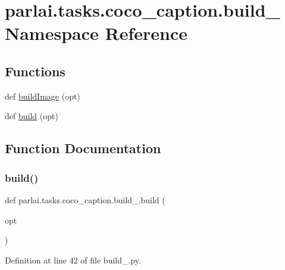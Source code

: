 \hypertarget{namespaceparlai_1_1tasks_1_1coco__caption_1_1build__2017}{}\section{parlai.\+tasks.\+coco\+\_\+caption.\+build\+\_ Namespace Reference}
\label{namespaceparlai_1_1tasks_1_1coco__caption_1_1build__2017}
\subsection*{Functions}
\begin{DoxyCompactItemize}
\item 
def \hyperlink{namespaceparlai_1_1tasks_1_1coco__caption_1_1build__2017_ae85e762d86aa89bda50b2f9b6df4f112}{build\+Image} (opt)
\item 
def \hyperlink{namespaceparlai_1_1tasks_1_1coco__caption_1_1build__2017_a7831ed11d47deae2c049d33a4fe035c8}{build} (opt)
\end{DoxyCompactItemize}


\subsection{Function Documentation}
\mbox{\label{namespaceparlai_1_1tasks_1_1coco__caption_1_1build__2017_a7831ed11d47deae2c049d33a4fe035c8}} 
\subsubsection{\texorpdfstring{build()}{build()}}
{\footnotesize\ttfamily def parlai.\+tasks.\+coco\+\_\+caption.\+build\+\_.\+build (\begin{DoxyParamCaption}\item[{}]{opt }\end{DoxyParamCaption})}



Definition at line 42 of file build\+\_.\+py.

\mbox{\label{namespaceparlai_1_1tasks_1_1coco__caption_1_1build__2017_ae85e762d86aa89bda50b2f9b6df4f112}} 
